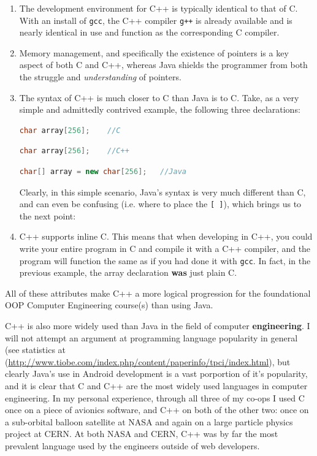 \documentclass[12pt]{article}
\numberwithin{figure}{section}
\numberwithin{equation}{section}
\begin{document}
{\begin{enumerate}
\item   The development environment for C++ is typically identical to that of
        C. With an install of \texttt{gcc}, the C++ compiler \texttt{g++} is
        already available and is nearly identical in use and function as the
        corresponding C compiler.
\item   Memory management, and specifically the existence of pointers is a key
        aspect of both C and C++, whereas Java shields the programmer from
        both the struggle and \emph{understanding} of pointers.
\item   The syntax of C++ is much closer to C than Java is to C. Take, as a
        very simple and admittedly contrived example, the following three
        declarations:

\begin{lstlisting}[language=C,label=c-code]
    char array[256];    //C
\end{lstlisting}

\begin{lstlisting}[language=C++,label=c-code]
    char array[256];    //C++
\end{lstlisting}

\begin{lstlisting}[language=Java,label=c-code]
    char[] array = new char[256];   //Java
\end{lstlisting}

Clearly, in this simple scenario, Java's syntax is very much different
than C, and can even be confusing (i.e. where to place the
\texttt{{[} {]}}), which brings us to the next point:

\item   C++ supports inline C. This means that when developing in C++, you
        could write your entire program in C and compile it with a C++
        compiler, and the program will function the same as if you had done it
        with \texttt{gcc}. In fact, in the previous example, the array
        declaration \textbf{was} just plain C.
\end{enumerate}

All of these attributes make C++ a more logical progression for the
foundational OOP Computer Engineering course(s) than using Java.

\bigskip

C++ is also more widely used than Java in the field of computer
\textbf{engineering}. I will not attempt an argument at programming
language popularity in general (see statistics at
(\url{http://www.tiobe.com/index.php/content/paperinfo/tpci/index.html}),
but clearly Java's use in Android development is a vast porportion of
it's popularity, and it is clear that C and C++ are the most widely used
languages in computer engineering. In my personal experience, through
all three of my co-ops I used C once on a piece of avionics software,
and C++ on both of the other two: once on a sub-orbital balloon
satellite at NASA and again on a large particle physics project at CERN.
At both NASA and CERN, C++ was by far the most prevalent language used
by the engineers outside of web developers.

}
\end{document}
